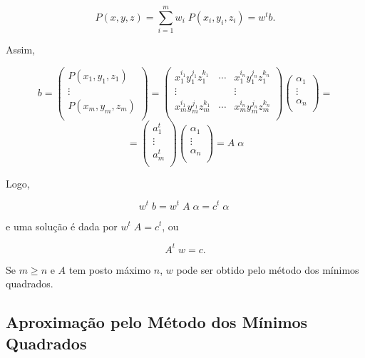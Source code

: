 $$
 P(x, y, z) = \sum_{i=1}^m w_i \; P(x_i, y_i, z_i) = w^t b.
$$

\noindent Assim,

$$
b = \left(
\begin{array}{c}
P(x_1,y_1,z_1) \\
\vdots \\
P(x_m,y_m,z_m) \\
\end{array}
\right) =
\left(
\begin{array}{ccc}
x_{1}^{i_1} y_{1}^{j_1} z_{1}^{k_1} & \cdots & x_{1}^{i_n} y_{1}^{j_n} z_{1}^{k_n} \\
\vdots &     & \vdots \\
x_{m}^{i_1} y_{m}^{j_1} z_{m}^{k_1} & \cdots & x_{m}^{i_n} y_{m}^{j_n} z_{m}^{k_n} \\
\end{array}
\right) \left(
\begin{array}{c}
\alpha_1 \\
\vdots \\
\alpha_n \\
\end{array}
\right) =
$$
$$
= \left(
\begin{array}{c}
a_1^t \\
\vdots \\
a_m^t \\
\end{array}
\right) \left(
\begin{array}{c}
\alpha_1 \\
\vdots \\
\alpha_n \\
\end{array}
\right) =
A \; \alpha
$$

\noindent Logo,

$$
w^t \; b = w^t \; A \; \alpha = c^t \; \alpha \;
$$

\noindent e uma solução é dada por $w^t \; A = c^t$, ou

$$
A^t \; w = c.
$$

\noindent Se $m \geq n$ e $A$ tem posto máximo $n$, $w$ pode ser obtido pelo
método dos mínimos quadrados.

\subsection{Aproximação pelo Método dos Mínimos Quadrados}

